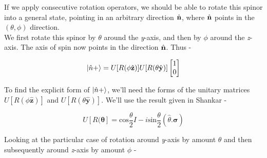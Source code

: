     If we apply consecutive rotation operators, we should be able to rotate this spinor into a general state, pointing in an arbitrary direction $\hat{\textbf{n}}$, where $\hat{\textbf{n}}$ points in the $(\theta, \phi)$ direction. \\
    We first rotate this spinor by $\theta$ around the \textit{y}-axis, and then by $\phi$ around the \textit{z}-axis. The axis of spin now points in the direction $\hat{\textbf{n}}$. Thus - 

    \begin{equation*}
        \ket{\hat{n}+} = U[R(\phi\hat{\mathbf{z}})]U[R(\theta\hat{\mathbf{y}})]
        \begin{bmatrix}
            1 \\
            0
        \end{bmatrix}
    \end{equation*}

    To find the explicit form of $\ket{\hat{n}+}$, we'll need the forms of the unitary matrices $U[R(\phi\hat{\mathbf{z}})]$ and $U[R(\theta\hat{\mathbf{y}})]$. We'll use the result given in Shankar - 

    \begin{equation*}
            U[R(\boldsymbol{\theta}] = \textrm{cos}\frac{\theta}{2}I - i\textrm{sin}\frac{\theta}{2}(\hat{\theta}.\boldsymbol{\sigma})
    \end{equation*}

    Looking at the particular case of rotation around \textit{y}-axis by amount $\theta$ and then subsequently around \textit{z}-axis by amount $\phi$ - 


